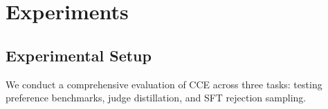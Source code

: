\section{Experiments}
\subsection{Experimental Setup}
We conduct a comprehensive evaluation of \textsc{CCE} across three tasks: testing preference benchmarks, judge distillation, and SFT rejection sampling. 

\begin{table*}[!t]
\centering
\small 

\end{table*}
